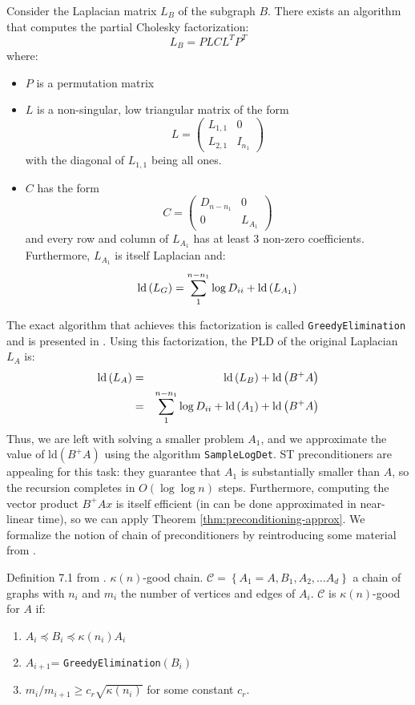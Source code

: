 Consider the Laplacian matrix $L_{B}$ of the subgraph $B$. There
exists an algorithm that computes the partial Cholesky factorization:
\[
L_{B}=PLCL^{T}P^{T}
\]
where: 
\begin{itemize}
\item $P$ is a permutation matrix 
\item $L$ is a non-singular, low triangular matrix of the form 
\[
L=\left(\begin{array}{cc}
L_{1,1} & 0\\
L_{2,1} & I_{n_{1}}
\end{array}\right)
\]
with the diagonal of $L_{1,1}$ being all ones. 
\item $C$ has the form 
\[
C=\left(\begin{array}{cc}
D_{n-n_{1}} & 0\\
0 & L_{A_{1}}
\end{array}\right)
\]
and every row and column of $L_{A_{1}}$ has at least 3 non-zero coefficients.
Furthermore, $L_{A_{1}}$ is itself Laplacian and: 
\[
\text{ld}\left(L_{G}\right)=\sum_{1}^{n-n_{1}}\log D_{ii}+\mbox{\text{ld}}\left(L_{A_{1}}\right)
\]

\end{itemize}
The exact algorithm that achieves this factorization is called \texttt{GreedyElimination}
and is presented in \cite{Koutis2010}. Using this factorization,
the PLD of the original Laplacian $L_{A}$ is: 
\begin{eqnarray}
\text{ld}\left(L_{A}\right) & = & \text{ld}\left(L_{B}\right)+\text{ld}\left(B^{+}A\right)\nonumber \\
 & = & \sum_{1}^{n-n_{1}}\log D_{ii}+\mbox{\text{ld}}\left(A_{1}\right)+\text{ld}\left(B^{+}A\right)\label{eq:chain-recursion}
\end{eqnarray}
Thus, we are left with solving a smaller problem $A_{1}$, and we
approximate the value of $\text{ld}\left(B^{+}A\right)$ using the
algorithm \texttt{SampleLogDet}. ST preconditioners are appealing
for this task: they guarantee that $A_{1}$ is substantially smaller
than $A$, so the recursion completes in $O\left(\log\log n\right)$
steps. Furthermore, computing the vector product $B^{+}Ax$ is itself
efficient (in can be done approximated in near-linear time), so we
can apply Theorem \ref{thm:preconditioning-approx}. We formalize
the notion of chain of preconditioners by reintroducing some material
from \cite{Koutis2010}.

\begin{definition} Definition 7.1 from \cite{Koutis2010}. $\kappa\left(n\right)$-good
chain. $\mathcal{C}=\left\{ A_{1}=A,B_{1},A_{2},\dots A_{d}\right\} $
a chain of graphs with $n_{i}$ and $m_{i}$ the number of vertices
and edges of $A_{i}$. $\mathcal{C}$ is $\kappa\left(n\right)$-good
for $A$ if: 
\begin{enumerate}
\item $A_{i}\preceq B_{i}\preceq\kappa\left(n_{i}\right)A_{i}$ 
\item $A_{i+1}$= \texttt{GreedyElimination}$\left(B_{i}\right)$ 
\item $m_{i}/m_{i+1}\geq c_{r}\sqrt{\kappa\left(n_{i}\right)}$ for some
constant $c_{r}$. 
\end{enumerate}
\end{definition}

